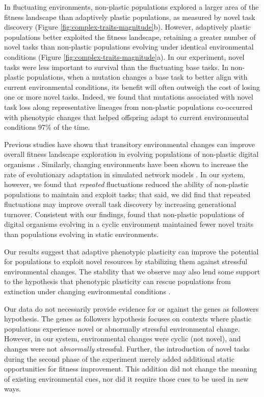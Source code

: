 In fluctuating environments, non-plastic populations explored a larger area of the fitness landscape than adaptively plastic populations, as measured by novel task discovery (Figure \ref{fig:complex-traits-magnitude}b).
However, adaptively plastic populations better exploited the fitness landscape, retaining a greater number of novel tasks than non-plastic populations evolving under identical environmental conditions (Figure \ref{fig:complex-traits-magnitude}a).
In our experiment, novel tasks were less important to survival than the fluctuating base tasks.
In non-plastic populations, when a mutation changes a base task to better align with current environmental conditions, its benefit will often outweigh the cost of losing one or more novel tasks. 
Indeed, we found that mutations associated with novel task loss along representative lineages from non-plastic populations co-occurred with phenotypic changes that helped offspring adapt to current environmental conditions 97\% of the time.

Previous studies have shown that transitory environmental changes can improve overall fitness landscape exploration in evolving populations of non-plastic digital organisms \citep{nahum_improved_2017}.
Similarly, changing environments have been shown to increase the rate of evolutionary adaptation in simulated network models \citep{kashtan2007varying}.
In our system, however, we found that \textit{repeated} fluctuations reduced the ability of non-plastic populations to maintain and exploit tasks; that said, we did find that repeated fluctuations may improve overall task discovery by increasing generational turnover. 
Consistent with our findings, \cite{canino-koning_fluctuating_2019} found that non-plastic populations of digital organisms evolving in a cyclic environment maintained fewer novel traits than populations evolving in static environments.

Our results suggest that adaptive phenotypic plasticity can improve the potential for populations to exploit novel resources by stabilizing them against stressful environmental changes.
The stability that we observe may also lend some support to the hypothesis that phenotypic plasticity can rescue populations from extinction under changing environmental conditions \citep{chevin_adaptation_2010}.

Our data do not necessarily provide evidence for or against the genes as followers hypothesis.
The genes as followers hypothesis focuses on contexts where plastic populations experience novel or abnormally stressful environmental change.
However, in our system, environmental changes were cyclic (not novel), and changes were not \textit{abnormally} stressful.
Further, the introduction of novel tasks during the second phase of the experiment merely added additional static opportunities for fitness improvement.
This addition did not change the meaning of existing environmental cues, nor did it require those cues to be used in new ways. 
 

